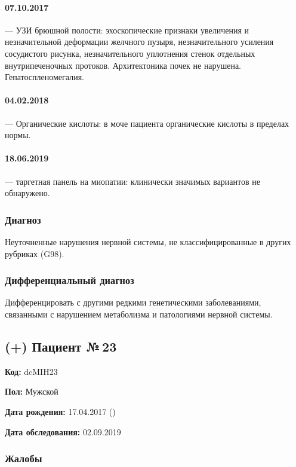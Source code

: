 \documentclass[a4paper,14pt]{extarticle}
\begin{document}
\paragraph{07.10.2017} --- УЗИ брюшной полости: эхоскопические признаки увеличения и незначительной деформации желчного пузыря, незначительного усиления сосудистого рисунка, незначительного уплотнения стенок отдельных внутрипеченочных протоков. Архитектоника почек не нарушена. Гепатоспленомегалия.

\paragraph{04.02.2018} --- Органические кислоты: в моче пациента органические кислоты в пределах нормы.

\paragraph{18.06.2019} --- таргетная панель на миопатии: клинически значимых вариантов не обнаружено.

\subsubsection*{Диагноз}

Неуточненные нарушения нервной системы, не классифицированные в других рубриках (G98).

\subsubsection*{Дифференциальный диагноз}

Дифференцировать с другими редкими генетическими заболеваниями, связанными с нарушением метаболизма и патологиями нервной системы.

\newpage
\subsection*{(+) Пациент №\,23}

\textbf{Код:} dcMIH23

\textbf{Пол:} Мужской

\textbf{Дата рождения:} 17.04.2017 ()

\textbf{Дата обследования:} 02.09.2019

\subsubsection*{Жалобы}
\end{document}
